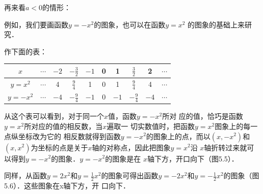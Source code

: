 再来看$a<0$的情形：

例如，我们要画函数$y=-x^2$的图象，也可以在函数$y=x^2$
的图象的基础上来研究．

作下面的表：
\begin{center}
\begin{tabular}{c|ccccccccc}
    \hline
$x$ &$\cdots$ & $-2$  & $-\tfrac{3}{2}$  & $-1$   & 0   & 1&$\tfrac{3}{2}$& 2&$\cdots$\\
\hline
$y=x^2$ &$\cdots$ & 4&$\tfrac{9}{4}$&1  & 0   & 1&$\tfrac{9}{4}$&4&$\cdots$\\
$y=-x^2$ &$\cdots$ & $-4$&$-\tfrac{9}{4}$&$-1$  & 0   & $-1$&$-\tfrac{9}{4}$&$-4$&$\cdots$\\
\hline
\end{tabular}    
\end{center}

从这个表可以看到，对于同一个$x$值，函数$y=-x^2$所对
应的值，恰巧是函数$y=x^2$所对应的值的相反数，当$x$遍取一
切实数值时，把函数$y=x^2$图象上的每一点纵坐标改为它的
相反数就得到函数$y=-x^2$的图象上的点，而以$(x,-x^2)$和
$(x,x^2)$为坐标的点是关于$x$轴的对称点，因此把图象$y=x^2$沿
$x$轴折转过来就可以得到$y=-x^2$的图象．$y=-x^2$的图象是在
$x$轴下方，开口向下（图5.5）．

同样，从函数$y=2x^2$和$y=\frac{1}{2}x^2$的图象可得出函数$y=
-2x^2$和$y=-\frac{1}{2}x^2$的图象（图5.6）．这些图象在x轴下方，开
口向下．

